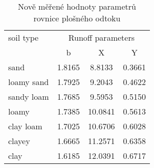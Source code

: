 \begin{table}[b!]
  \centering
  \caption{{Nově měřené hodnoty parametrů rovnice plošného odtoku \citep{Neumann15:232823}}}
    \begin{tabular}{lccc}
    \hline  \hline 
      soil type &     \multicolumn{3}{c}{Runoff parameters}\\
     & \multicolumn{1}{c}{b} & \multicolumn{1}{c}{X} & \multicolumn{1}{c}{Y} \\
	\hline      
    sand  & 1.8165 & 8.8133 & 0.3661 \\
    loamy sand & 1.7925 & 9.2043 & 0.4622 \\
    sandy loam & 1.7685 & 9.5953 & 0.5150 \\
    loamy & 1.7385 & 10.0841 & 0.5613 \\
    clay loam & 1.7025 & 10.6706 & 0.6028 \\
    clayey & 1.6665 & 11.2571 & 0.6358 \\
    clay  & 1.6185 & 12.0391 & 0.6717 \\
    \hline   \hline 
    \end{tabular}%
  \label{tab:Neuman_param}%
\end{table}%

